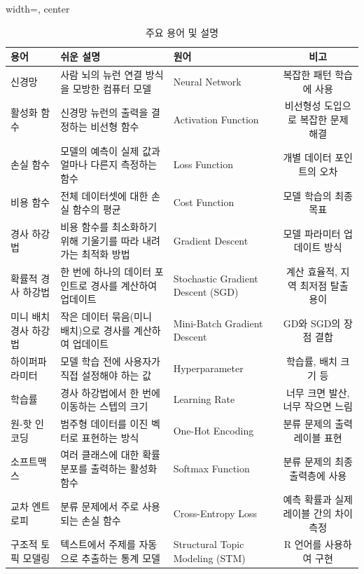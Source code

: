 \documentclass[11pt,a4paper]{book}
\theoremstyle{definition}
\begin{document}
\begin{table}[h!]
\centering
\caption{주요 용어 및 설명}
\label{tab:glossary}
\begin{adjustbox}{width=\textwidth, center}
\begin{tabular}{lllc}
\toprule
\textbf{용어} & \textbf{쉬운 설명} & \textbf{원어} & \textbf{비고} \\
\midrule
신경망 & 사람 뇌의 뉴런 연결 방식을 모방한 컴퓨터 모델 & Neural Network & 복잡한 패턴 학습에 사용 \\
활성화 함수 & 신경망 뉴런의 출력을 결정하는 비선형 함수 & Activation Function & 비선형성 도입으로 복잡한 문제 해결 \\
손실 함수 & 모델의 예측이 실제 값과 얼마나 다른지 측정하는 함수 & Loss Function & 개별 데이터 포인트의 오차 \\
비용 함수 & 전체 데이터셋에 대한 손실 함수의 평균 & Cost Function & 모델 학습의 최종 목표 \\
경사 하강법 & 비용 함수를 최소화하기 위해 기울기를 따라 내려가는 최적화 방법 & Gradient Descent & 모델 파라미터 업데이트 방식 \\
확률적 경사 하강법 & 한 번에 하나의 데이터 포인트로 경사를 계산하여 업데이트 & Stochastic Gradient Descent (SGD) & 계산 효율적, 지역 최저점 탈출 용이 \\
미니 배치 경사 하강법 & 작은 데이터 묶음(미니 배치)으로 경사를 계산하여 업데이트 & Mini-Batch Gradient Descent & GD와 SGD의 장점 결합 \\
하이퍼파라미터 & 모델 학습 전에 사용자가 직접 설정해야 하는 값 & Hyperparameter & 학습률, 배치 크기 등 \\
학습률 & 경사 하강법에서 한 번에 이동하는 스텝의 크기 & Learning Rate & 너무 크면 발산, 너무 작으면 느림 \\
원-핫 인코딩 & 범주형 데이터를 이진 벡터로 표현하는 방식 & One-Hot Encoding & 분류 문제의 출력 레이블 표현 \\
소프트맥스 & 여러 클래스에 대한 확률 분포를 출력하는 활성화 함수 & Softmax Function & 분류 문제의 최종 출력층에 사용 \\
교차 엔트로피 & 분류 문제에서 주로 사용되는 손실 함수 & Cross-Entropy Loss & 예측 확률과 실제 레이블 간의 차이 측정 \\
구조적 토픽 모델링 & 텍스트에서 주제를 자동으로 추출하는 통계 모델 & Structural Topic Modeling (STM) & R 언어를 사용하여 구현 \\
\bottomrule
\end{tabular}%
\end{adjustbox}
\end{table}
\end{document}
